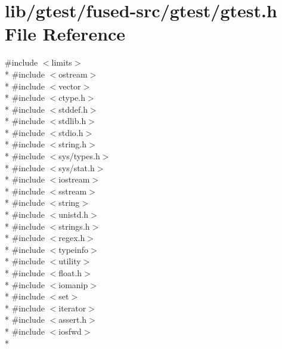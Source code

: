 \hypertarget{fused-src_2gtest_2gtest_8h}{\section{lib/gtest/fused-\/src/gtest/gtest.h File Reference}
\label{fused-src_2gtest_2gtest_8h}
}
{\ttfamily \#include $<$limits$>$}\\*
{\ttfamily \#include $<$ostream$>$}\\*
{\ttfamily \#include $<$vector$>$}\\*
{\ttfamily \#include $<$ctype.\-h$>$}\\*
{\ttfamily \#include $<$stddef.\-h$>$}\\*
{\ttfamily \#include $<$stdlib.\-h$>$}\\*
{\ttfamily \#include $<$stdio.\-h$>$}\\*
{\ttfamily \#include $<$string.\-h$>$}\\*
{\ttfamily \#include $<$sys/types.\-h$>$}\\*
{\ttfamily \#include $<$sys/stat.\-h$>$}\\*
{\ttfamily \#include $<$iostream$>$}\\*
{\ttfamily \#include $<$sstream$>$}\\*
{\ttfamily \#include $<$string$>$}\\*
{\ttfamily \#include $<$unistd.\-h$>$}\\*
{\ttfamily \#include $<$strings.\-h$>$}\\*
{\ttfamily \#include $<$regex.\-h$>$}\\*
{\ttfamily \#include $<$typeinfo$>$}\\*
{\ttfamily \#include $<$utility$>$}\\*
{\ttfamily \#include $<$float.\-h$>$}\\*
{\ttfamily \#include $<$iomanip$>$}\\*
{\ttfamily \#include $<$set$>$}\\*
{\ttfamily \#include $<$iterator$>$}\\*
{\ttfamily \#include $<$assert.\-h$>$}\\*
{\ttfamily \#include $<$iosfwd$>$}\\*
